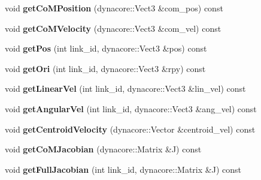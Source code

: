 \begin{DoxyCompactItemize}
void {\bfseries get\+Co\+M\+Position} (dynacore\+::\+Vect3 \&com\+\_\+pos) const
\item 
\mbox{\label{classquadruped_1_1FloatingBaseModel_a10349bcc5d2bf90b5587773efab8cc44}} 
void {\bfseries get\+Co\+M\+Velocity} (dynacore\+::\+Vect3 \&com\+\_\+vel) const
\item 
\mbox{\label{classquadruped_1_1FloatingBaseModel_a6e7a003cb230a5ec8696c46a2047a6c0}} 
void {\bfseries get\+Pos} (int link\+\_\+id, dynacore\+::\+Vect3 \&pos) const
\item 
\mbox{\label{classquadruped_1_1FloatingBaseModel_ab66894859661648f90a2218a43ad0b01}} 
void {\bfseries get\+Ori} (int link\+\_\+id, dynacore\+::\+Vect3 \&rpy) const
\item 
\mbox{\label{classquadruped_1_1FloatingBaseModel_a400825b773081cdd886383624d53b542}} 
void {\bfseries get\+Linear\+Vel} (int link\+\_\+id, dynacore\+::\+Vect3 \&lin\+\_\+vel) const
\item 
\mbox{\label{classquadruped_1_1FloatingBaseModel_a48efc47609ab056a82d0cc8bd882bf04}} 
void {\bfseries get\+Angular\+Vel} (int link\+\_\+id, dynacore\+::\+Vect3 \&ang\+\_\+vel) const
\item 
\mbox{\label{classquadruped_1_1FloatingBaseModel_ac94400de545c66a32020c4d3671ccff0}} 
void {\bfseries get\+Centroid\+Velocity} (dynacore\+::\+Vector \&centroid\+\_\+vel) const
\item 
\mbox{\label{classquadruped_1_1FloatingBaseModel_a1b0c2f3c829e2544edb507a5934411f6}} 
void {\bfseries get\+Co\+M\+Jacobian} (dynacore\+::\+Matrix \&J) const
\item 
\mbox{\label{classquadruped_1_1FloatingBaseModel_a4076657aec4909dc3e2cda3dd57ba701}} 
void {\bfseries get\+Full\+Jacobian} (int link\+\_\+id, dynacore\+::\+Matrix \&J) const
\item 
\mbox{\label{classquadruped_1_1FloatingBaseModel_a0a1208545b05039a0e5ced7dfa90a9ae}} 

\end{DoxyCompactItemize}
